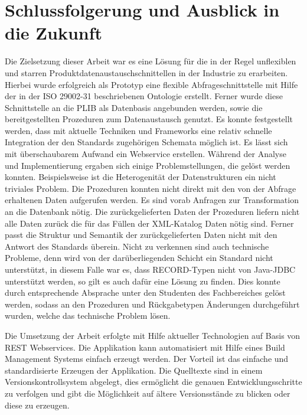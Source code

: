 \chapter*{Schlussfolgerung und Ausblick in die Zukunft}


Die Zielsetzung dieser Arbeit war es eine Lösung für die in der Regel unflexiblen und starren Produktdatenaustauschschnittellen in der Industrie zu erarbeiten. Hierbei wurde erfolgreich als Prototyp eine flexible \gls{Abfrageschnittstelle} mit Hilfe der in der ISO 29002-31 beschriebenen \gls{Ontologie} erstellt. Ferner wurde diese Schnittstelle an die \gls{PLIB} als Datenbasis angebunden werden, sowie die bereitgestellten Prozeduren zum Datenaustausch genutzt. Es konnte festgestellt werden, dass mit aktuelle Techniken und Frameworks eine relativ schnelle Integration der den Standards zugehörigen Schemata möglich ist. Es lässt sich mit überschaubarem Aufwand ein \gls{Webservice} erstellen. 
Während der Analyse und Implementierung ergaben sich einige Problemstellungen, die gelöst werden konnten. Beispielsweise ist die Heterogenität der Datenstrukturen ein nicht triviales Problem. Die Prozeduren konnten nicht direkt mit den von der Abfrage erhaltenen Daten aufgerufen werden. Es sind vorab Anfragen zur Transformation an die Datenbank nötig. 
Die zurückgelieferten Daten der Prozeduren liefern nicht alle Daten zurück die für das Füllen der XML-Katalog Daten nötig sind. Ferner passt die Struktur und Semantik der zurückgelieferten Daten nicht mit den Antwort des Standards überein. Nicht zu verkennen sind auch technische Probleme, denn wird von der darüberliegenden Schicht ein Standard nicht unterstützt, in diesem Falle war es, dass RECORD-Typen nicht von Java-JDBC unterstützt werden, so gilt es auch dafür eine Lösung zu finden. 
Dies konnte durch entsprechende Absprache unter den Studenten des Fachbereiches gelöst werden, sodass an den Prozeduren und Rückgabetypen Änderungen durchgeführt wurden, welche das technische Problem lösen.

Die Umsetzung der Arbeit erfolgte mit Hilfe aktueller Technologien auf Basis von \gls{REST} \glspl{Webservice}. Die Applikation kann automatisiert mit Hilfe eines Build Management Systems einfach erzeugt werden. Der Vorteil ist das einfache und standardisierte Erzeugen der Applikation. Die Quelltexte sind in einem Versionskontrollsystem abgelegt, dies ermöglicht die genauen Entwicklungsschritte zu verfolgen und gibt die Möglichkeit auf ältere Versionsstände zu blicken oder diese zu erzeugen. 

